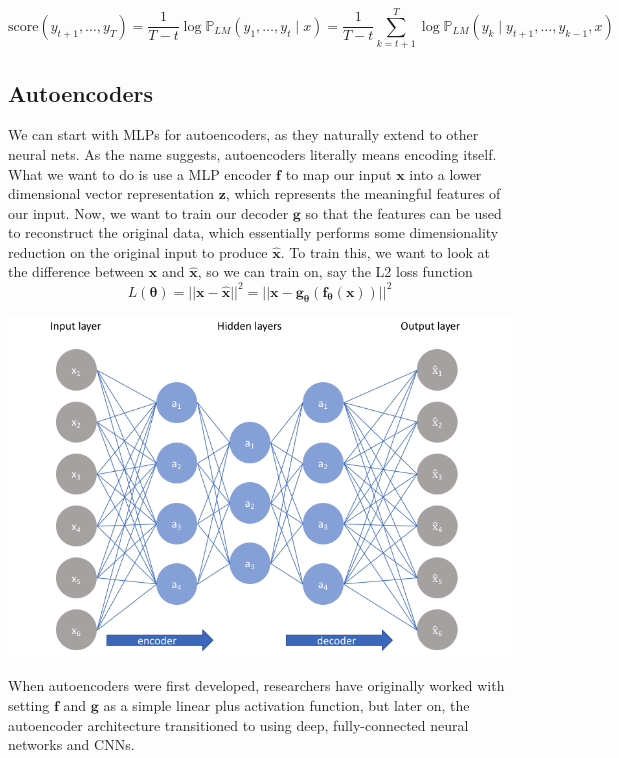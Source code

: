 \documentclass{article}
\theoremstyle{definition}
\theoremstyle{remark}
\theoremstyle{definition}
\begin{document}
\[\mathrm{score}(y_{t+1}, \ldots, y_T) = \frac{1}{T-t} \log \mathbb{P}_{LM} (y_1, \ldots, y_t \mid x) = \frac{1}{T-t} \sum_{k=t+1}^T \log \mathbb{P}_{LM} ( y_k \mid y_{t+1}, \ldots, y_{k-1}, x) \]

\subsection{Autoencoders}

We can start with MLPs for autoencoders, as they naturally extend to other neural nets. As the name suggests, autoencoders literally means encoding itself. What we want to do is use a MLP encoder $\mathbf{f}$ to map our input $\mathbf{x}$ into a lower dimensional vector representation $\mathbf{z}$, which represents the meaningful features of our input. Now, we want to train our decoder $\mathbf{g}$ so that the features can be used to reconstruct the original data, which essentially performs some dimensionality reduction on the original input to produce $\hat{\mathbf{x}}$. To train this, we want to look at the difference between $\mathbf{x}$ and $\hat{\mathbf{x}}$, so we can train on, say the L2 loss function 
\[L(\boldsymbol{\theta}) = ||\mathbf{x} - \hat{\mathbf{x}}||^2 = ||\mathbf{x} - \mathbf{g}_{\boldsymbol{\theta}} ( \mathbf{f}_{\boldsymbol{\theta}} (\mathbf{x}))||^2 \]
\begin{center}
    \includegraphics[scale=0.3]{img/autoencoder.png}
\end{center}
When autoencoders were first developed, researchers have originally worked with setting $\mathbf{f}$ and $\mathbf{g}$ as a simple linear plus activation function, but later on, the autoencoder architecture transitioned to using deep, fully-connected neural networks and CNNs. 
\end{document}
